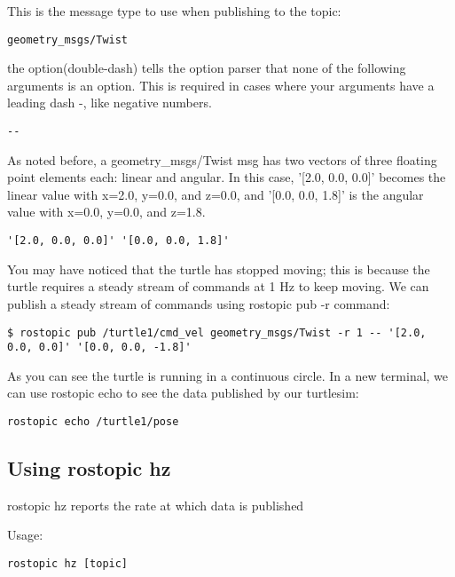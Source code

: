This is the message type to use when publishing to the topic:
\begin{lstlisting}[breaklines=true languages=bash]
geometry_msgs/Twist
\end{lstlisting}

the option(double-dash) tells the option parser that none of the following arguments is an option. This is required in cases where your arguments have a leading dash -, like negative numbers.
\begin{lstlisting}[breaklines=true languages=bash]
--
\end{lstlisting}

As noted before, a geometry\_msgs/Twist msg has two vectors of three floating point elements each: linear and angular. In this case, '[2.0, 0.0, 0.0]' becomes the linear value with x=2.0, y=0.0, and z=0.0, and '[0.0, 0.0, 1.8]' is the angular value with x=0.0, y=0.0, and z=1.8.
\begin{lstlisting}[breaklines=true languages=yaml]
'[2.0, 0.0, 0.0]' '[0.0, 0.0, 1.8]' 
\end{lstlisting}

You may have noticed that the turtle has stopped moving; this is because the turtle requires a steady stream of commands at 1 Hz to keep moving. We can publish a steady stream of commands using rostopic pub -r command:

\begin{lstlisting}[breaklines=true languages=bash]
$ rostopic pub /turtle1/cmd_vel geometry_msgs/Twist -r 1 -- '[2.0, 0.0, 0.0]' '[0.0, 0.0, -1.8]'
\end{lstlisting}

As you can see the turtle is running in a continuous circle. In a new terminal, we can use rostopic echo to see the data published by our turtlesim:

\begin{lstlisting}[breaklines=true languages=bash]
rostopic echo /turtle1/pose
\end{lstlisting}

\subsection{Using rostopic hz}

rostopic hz reports the rate at which data is published

Usage:
\begin{lstlisting}[breaklines=true languages=bash]
rostopic hz [topic]
\end{lstlisting}

